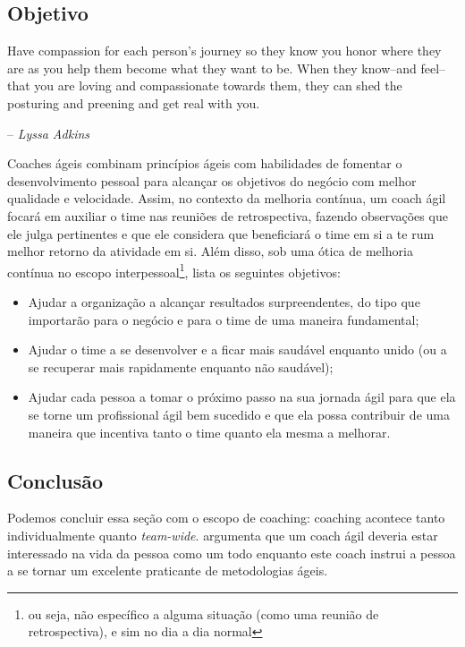 \documentclass{iiufrgs}
\begin{document}
\subsection{Objetivo}

\epigraph{Have compassion for each person's journey so they know you honor where they are as you help them become what they want to be. When they know--and feel--that you are loving and compassionate towards them, they can shed the posturing and preening and get real with you.}{-- \textit{Lyssa Adkins}}

Coaches ágeis combinam princípios ágeis com habilidades de fomentar o desenvolvimento pessoal para alcançar os objetivos do negócio com melhor qualidade e velocidade. Assim, no contexto da melhoria contínua, um coach ágil focará em auxiliar o time nas reuniões de retrospectiva, fazendo observações que ele julga pertinentes e que ele considera que beneficiará o time em si a te rum melhor retorno da atividade em si. Além disso, sob uma ótica de melhoria contínua no escopo interpessoal\footnote{ou seja, não específico a alguma situação (como uma reunião de retrospectiva), e sim no dia a dia normal}, \citet{Adkins2010Coaching} lista os seguintes objetivos:

\begin{itemize}[leftmargin=3em, noitemsep, nosep, before=\vspace{1cm}, after=\vspace{1cm}]
    \setlength{\itemindent}{1em}
    \item Ajudar a organização a alcançar resultados surpreendentes, do tipo que importarão para o negócio e para o time de uma maneira fundamental;
    \item Ajudar o time a se desenvolver e a ficar mais saudável enquanto unido (ou a se recuperar mais rapidamente enquanto não saudável);
    \item Ajudar cada pessoa a tomar o próximo passo na sua jornada ágil para que ela se torne um profissional ágil bem sucedido e que ela possa contribuir de uma maneira que incentiva tanto o time quanto ela mesma a melhorar.
\end{itemize}

\subsection{Conclusão}

Podemos concluir essa seção com o escopo de coaching: coaching acontece tanto individualmente quanto \textit{team-wide}. \citeauthor{Adkins2010Coaching} argumenta que um coach ágil deveria estar interessado na vida da pessoa como um todo enquanto este coach instrui a pessoa a se tornar um excelente praticante de metodologias ágeis.
\end{document}

